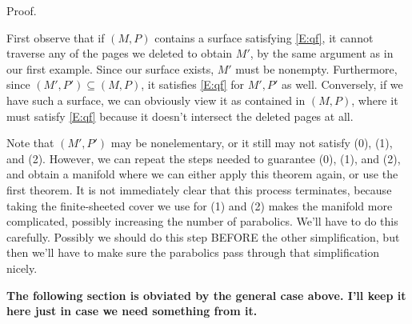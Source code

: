 \documentclass[12pt]{amsart}
\theoremstyle{definition}
\theoremstyle{remark}
\newcommand{\cin}{\subseteq}
\begin{document}
Proof.

First observe that if $(M,P)$ contains a surface satisfying \eqref{E:qf}, it cannot
traverse any of the pages we deleted to obtain $M'$, by the same argument as in
our first example.  Since our surface exists, $M'$ must be nonempty.
Furthermore, since $(M',P') \cin (M,P)$, it satisfies \eqref{E:qf} for $M',P'$ as well.
Conversely, if we have such a surface, we can obviously view it as contained in
$(M,P)$, where it must satisfy \eqref{E:qf} because it doesn't intersect the deleted
pages at all.

Note that $(M',P')$ may be nonelementary, or it still may not satisfy (0), (1),
and (2).  However, we can repeat the steps needed to guarantee (0), (1), and
(2), and obtain a manifold where we can either apply this theorem again, or use
the first theorem. It is not immediately clear that this process terminates,
because taking the finite-sheeted cover we use for (1) and (2) makes the
manifold more complicated, possibly increasing the number of parabolics. We'll
have to do this carefully. Possibly we should do this step BEFORE the other
simplification, but then we'll have to make sure the parabolics pass through
that simplification nicely.

{\bf The following section is obviated by the general case above. I'll keep it
here just in case we need something from it. }
\end{document}
